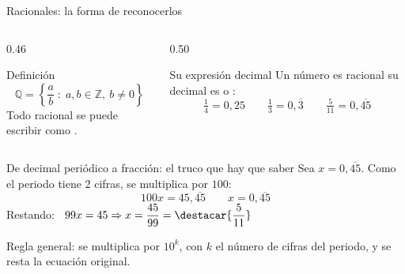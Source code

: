 \documentclass[aspectratio=169,10pt]{beamer}
\begin{document}
\begin{frame}{Racionales: la forma de reconocerlos}
  \scriptsize
  \begin{columns}[T,onlytextwidth]
    \begin{column}{0.46\textwidth}
      \begin{block}{Definición}
        \scriptsize
        \[ \mathbb{Q} = \left\{ \frac{a}{b} \;:\; a, b \in \mathbb{Z},\
           b \neq 0 \right\} \]
        Todo racional se puede escribir como .
      \end{block}
    \end{column}
    \begin{column}{0.50\textwidth}
      \begin{exampleblock}{Su expresión decimal}
        \scriptsize
        Un número es racional  su decimal es
         o :
        \[ \tfrac{1}{4} = 0{,}25 \qquad \tfrac{1}{3} = 0{,}\overline{3}
           \qquad \tfrac{5}{11} = 0{,}\overline{45} \]
      \end{exampleblock}
    \end{column}
  \end{columns}

  \vspace{0.08cm}
  \begin{block}{De decimal periódico a fracción: el truco que hay que saber}
    \tiny
    Sea $x = 0{,}\overline{45}$. Como el periodo tiene 2 cifras, se multiplica
    por $100$:
    \[ 100x = 45{,}\overline{45} \qquad x = 0{,}\overline{45} \]
    Restando: \ $99x = 45 \Rightarrow x = \dfrac{45}{99} = \destacar{\dfrac{5}{11}}$
  \end{block}

  {\tiny\color{uniGris} Regla general: se multiplica por $10^{k}$, con $k$ el
  número de cifras del periodo, y se resta la ecuación original.}
\end{frame}
\end{document}
